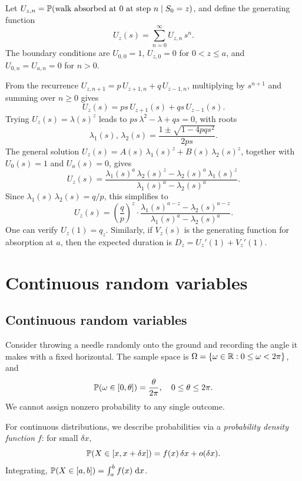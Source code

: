 \documentclass[a4paper]{article}
\begin{document}
\begin{eg}
  Let $U_{z,n} = \P(\text{walk absorbed at $0$ at step $n$} \mid S_0 = z)$, and define the generating function
  \[
    U_z(s) = \sum_{n=0}^\infty U_{z,n}\,s^n.
  \]
  The boundary conditions are $U_{0,0} = 1$, $U_{z,0} = 0$ for $0 < z \leq a$, and $U_{0,n} = U_{a,n} = 0$ for $n > 0$.

  From the recurrence $U_{z,n+1} = p\,U_{z+1,n} + q\,U_{z-1,n}$, multiplying by $s^{n+1}$ and summing over $n \geq 0$ gives
  \[
    U_z(s) = ps\,U_{z+1}(s) + qs\,U_{z-1}(s).
  \]
  Trying $U_z(s) = \lambda(s)^z$ leads to $ps\,\lambda^2 - \lambda + qs = 0$, with roots
  \[
    \lambda_1(s),\, \lambda_2(s) = \frac{1 \pm \sqrt{1 - 4pqs^2}}{2ps}.
  \]
  The general solution $U_z(s) = A(s)\,\lambda_1(s)^z + B(s)\,\lambda_2(s)^z$, together with $U_0(s) = 1$ and $U_a(s) = 0$, gives
  \[
    U_z(s) = \frac{\lambda_1(s)^a\,\lambda_2(s)^z - \lambda_2(s)^a\,\lambda_1(s)^z}{\lambda_1(s)^a - \lambda_2(s)^a}.
  \]
  Since $\lambda_1(s)\,\lambda_2(s) = q/p$, this simplifies to
  \[
    U_z(s) = \left(\frac{q}{p}\right)^z \cdot \frac{\lambda_1(s)^{a-z} - \lambda_2(s)^{a-z}}{\lambda_1(s)^a - \lambda_2(s)^a}.
  \]
  One can verify $U_z(1) = q_z$.
  Similarly, if $V_z(s)$ is the generating function for absorption at $a$, then the expected duration is $D_z = U_z'(1) + V_z'(1)$.
\end{eg}
\section{Continuous random variables}
\subsection{Continuous random variables}
\begin{eg}
  Consider throwing a needle randomly onto the ground and recording the angle it makes with a fixed horizontal.
  The sample space is $\Omega = \{\omega \in \R : 0 \leq \omega < 2\pi\}$, and
  \[
    \P(\omega \in [0, \theta]) = \frac{\theta}{2\pi}, \quad 0 \leq \theta \leq 2\pi.
  \]
  We cannot assign nonzero probability to any single outcome.
\end{eg}

\begin{remark}
  For continuous distributions, we describe probabilities via a \emph{probability density function} $f$: for small $\delta x$,
  \[
    \P(X \in [x, x + \delta x]) = f(x)\,\delta x + o(\delta x).
  \]
  Integrating, $\P(X \in [a, b]) = \int_a^b f(x)\;\d x$.
\end{remark}
\end{document}

